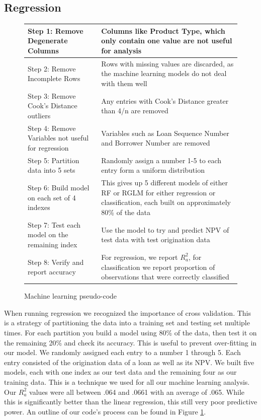 \documentclass[12 pt]{uncw_thesis}
\theoremstyle{plain}
\theoremstyle{remark}
\theoremstyle{definition}
\begin{document}
\subsection{Regression}
\begin{figure}
\begin{center}
	\begin{tabular}{|M{5.5cm}|M{8.75cm}|}
		\hline
		Step 1: Remove Degenerate Columns & Columns like Product Type, which only contain one value are not useful for analysis\\
		\hline
		Step 2: Remove Incomplete Rows & Rows with missing values are discarded, as the machine learning models do not deal with them well\\
		\hline
		Step 3: Remove Cook's Distance outliers & Any entries with Cook's Distance greater than 4/n are removed\\
		\hline
		Step 4: Remove Variables not useful for regression & Variables such as Loan Sequence Number and Borrower Number are removed\\
		\hline
		Step 5: Partition data into 5 sets & Randomly assign a number 1-5 to each entry form a uniform distribution\\
		\hline
		Step 6: Build model on each set of 4 indexes & This gives up 5 different models of either RF or RGLM for either regression or classification, each built on approximately 80\% of the data\\
		\hline
		Step 7: Test each model on the remaining index & Use the model to try and predict NPV of test data with test origination data\\
		\hline
		Step 8: Verify and report accuracy & For regression, we report \(R_a^2\), for classification we report proportion of observations that were correctly classified\\ 
		\hline
	\end{tabular}
\end{center}
\caption{Machine learning pseudo-code} \label{fig:MLCode}
\end{figure}
When running regression we recognized the importance of cross validation. This is a strategy of partitioning the data into a training set and testing set multiple times. For each partition you build a model using 80\% of the data, then test it on the remaining 20\% and check its accuracy. This is useful to prevent over-fitting in our model. We randomly assigned each entry to a number 1 through 5. Each entry consisted of the origination data of a loan as well as its NPV. We built five models, each with one index as our test data and the remaining four as our training data. This is a technique we used for all our machine learning analysis. Our \(R_a^2\) values were all between .064 and .0661 with an average of .065. While this is significantly better than the linear regression, this still very poor predictive power. An outline of our code's process can be found in Figure \ref{fig:MLCode}.
\end{document}
